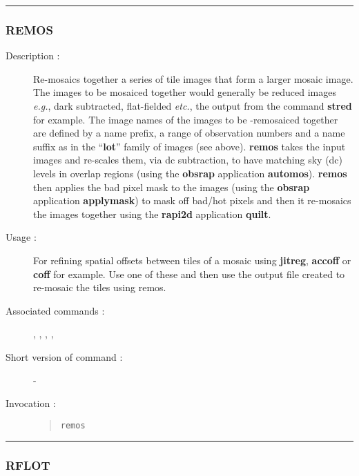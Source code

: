 \hrule
\subsubsection*{\label{REMOS}REMOS}

\begin{description}

\item[Description :] Re-mosaics together a series of tile images that
form a larger mosaic image.  The images to be mosaiced together would
generally be reduced images \emph{e.g.}, dark subtracted, flat-fielded
\emph{etc.}, the output from the command {\bf stred} for example.  The
image names of the images to be -remosaiced together are defined by a
name prefix, a range of observation numbers and a name suffix as in the
``{\bf lot}'' family of images (see above).  {\bf remos} takes the
input images and re-scales them, via dc subtraction, to have matching
sky (dc) levels in overlap regions (using the {\bf obsrap} application
{\bf automos}).  {\bf remos} then applies the bad pixel mask to the
images (using the {\bf obsrap} application {\bf applymask}) to mask off
bad/hot pixels and then it re-mosaics the images together using the
{\bf rapi2d} application {\bf quilt}.

\item[Usage :] For refining spatial offsets between tiles of a
mosaic using {\bf jitreg}, {\bf accoff} or {\bf coff} for example.  Use one
of these and then use the output file created to re-mosaic the tiles
using remos.

\item[Associated commands :] {\tt {}},
{\tt {}}, {\tt {}},
{\tt {}}, {\tt {}}

\item[Short version of command :] -
\item[Invocation :]

\begin{quote}{\tt  remos }\end{quote}

\end{description}

\hrule
\subsubsection*{\label{RFLOT}RFLOT}

